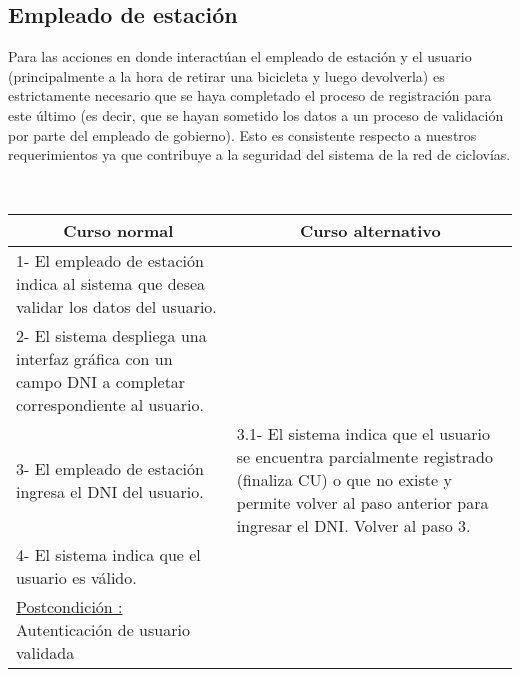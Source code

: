 \subsection{Empleado de estación}

Para las acciones en donde interactúan el empleado de estación y el usuario (principalmente a la hora de retirar una bicicleta
y luego devolverla)
es estrictamente necesario que se haya completado
el proceso de registración para este último (es decir, que se hayan sometido los datos a un proceso de validación por parte
del empleado de gobierno). Esto es consistente respecto a nuestros requerimientos ya que contribuye a la seguridad
del sistema de la red de ciclovías.

~

\begin{center}
    \centering
    \begin{tabular}{ | p{11cm} | p{6cm} | }
    	\multicolumn{1}{c}{\cellcolor{black!30}\textbf{Curso normal}} & 
    	\multicolumn{1}{c}{\cellcolor{black!30}\textbf{Curso alternativo}} \\
		\hline
		1- El empleado de estación indica al sistema que desea validar los datos del usuario. &  \\ \hline
		2- El sistema despliega una interfaz gráfica con un campo DNI a completar correspondiente al usuario. &  \\ \hline
		3- El empleado de estación ingresa el DNI del usuario. &  
		3.1- El sistema indica que el usuario se encuentra parcialmente registrado (finaliza CU) o que no existe y permite volver al paso anterior para ingresar el DNI. Volver al paso 3. \\ \hline
		4- El sistema indica que el usuario es válido. & \\ \hline
		\underline{Postcondición :} Autenticación de usuario validada & \\ \hline
    \end{tabular}
\end{center}

~

